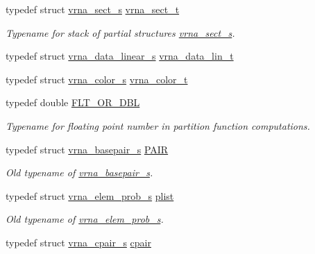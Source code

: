 \begin{DoxyCompactItemize}
typedef struct \mbox{\hyperlink{group__data__structures_structvrna__sect__s}{vrna\+\_\+sect\+\_\+s}} \mbox{\hyperlink{group__data__structures_gacc9cdae790dac75a7024e7069c0d4400}{vrna\+\_\+sect\+\_\+t}}
\begin{DoxyCompactList}\small\item\em Typename for stack of partial structures \mbox{\hyperlink{group__data__structures_structvrna__sect__s}{vrna\+\_\+sect\+\_\+s}}. \end{DoxyCompactList}\item 
typedef struct \mbox{\hyperlink{group__data__structures_structvrna__data__linear__s}{vrna\+\_\+data\+\_\+linear\+\_\+s}} \mbox{\hyperlink{group__data__structures_gaab843d6cdafd5433e3f6fa3b834d12f9}{vrna\+\_\+data\+\_\+lin\+\_\+t}}
\item 
typedef struct \mbox{\hyperlink{group__data__structures_structvrna__color__s}{vrna\+\_\+color\+\_\+s}} \mbox{\hyperlink{group__data__structures_gaed93ddf2ef6b26141a89f9a65b9426b9}{vrna\+\_\+color\+\_\+t}}
\item 
typedef double \mbox{\hyperlink{group__data__structures_ga31125aeace516926bf7f251f759b6126}{F\+L\+T\+\_\+\+O\+R\+\_\+\+D\+BL}}
\begin{DoxyCompactList}\small\item\em Typename for floating point number in partition function computations. \end{DoxyCompactList}\item 
typedef struct \mbox{\hyperlink{group__data__structures_structvrna__basepair__s}{vrna\+\_\+basepair\+\_\+s}} \mbox{\hyperlink{group__data__structures_ga4381025ffbd692e54189b2c679c79c99}{P\+A\+IR}}
\begin{DoxyCompactList}\small\item\em Old typename of \mbox{\hyperlink{group__data__structures_structvrna__basepair__s}{vrna\+\_\+basepair\+\_\+s}}. \end{DoxyCompactList}\item 
typedef struct \mbox{\hyperlink{group__struct__utils_structvrna__elem__prob__s}{vrna\+\_\+elem\+\_\+prob\+\_\+s}} \mbox{\hyperlink{group__data__structures_ga9608eed021ebfbdd7a901cfdc446c8e9}{plist}}
\begin{DoxyCompactList}\small\item\em Old typename of \mbox{\hyperlink{group__struct__utils_structvrna__elem__prob__s}{vrna\+\_\+elem\+\_\+prob\+\_\+s}}. \end{DoxyCompactList}\item 
typedef struct \mbox{\hyperlink{group__data__structures_structvrna__cpair__s}{vrna\+\_\+cpair\+\_\+s}} \mbox{\hyperlink{group__data__structures_ga8412f116a2eb07b59ade9e14ca7c5ef1}{cpair}}

\end{DoxyCompactItemize}
